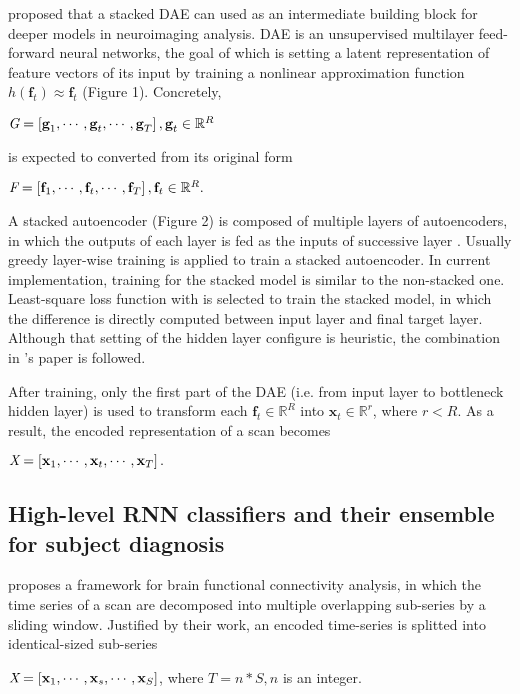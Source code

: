 \textcite{suk16} proposed that a stacked DAE can used as an intermediate building block for deeper models in neuroimaging analysis. DAE is an unsupervised multilayer feed-forward neural networks, the goal of which is setting a latent representation of feature vectors of its input by training a nonlinear approximation function $h(\textbf{f}_t) \approx \textbf{f}_t$ (Figure 1). Concretely, 
\begin{center}
$\emph{G} = \left[ \textbf{g}_1, \cdots, \textbf{g}_t, \cdots, \textbf{g}_T \right], \textbf{g}_t \in \mathbb{R}^{R}$ 
\end{center}
is expected to converted from its original form 
\begin{center}
$\emph{F} = \left[ \textbf{f}_1, \cdots, \textbf{f}_t, \cdots, \textbf{f}_T \right], \textbf{f}_t \in \mathbb{R}^{R}. $
\end{center} 

A stacked autoencoder (Figure 2) is composed of multiple layers of autoencoders, in which the outputs of each layer is fed as the inputs of successive layer \cite{stackedDAE}. Usually greedy layer-wise training is applied to train a stacked autoencoder. In current implementation, training for the stacked model is similar to the non-stacked one. Least-square loss function with  is selected to train the stacked model, in which the difference is directly computed between input layer and final target layer. Although that setting of the hidden layer configure is  heuristic, the combination in \textcite{suk16}'s paper is followed. 

After training, only the first part of the DAE (i.e. from input layer to bottleneck hidden layer) is used to transform each $\textbf{f}_t \in  \mathbb{R}^{R}$ into $ \textbf{x}_t \in  \mathbb{R}^{r}$, where $ r < R$. As a result, the encoded representation of a scan becomes
\begin{center}
$\emph{X} = \left[ \textbf{x}_1, \cdots, \textbf{x}_t, \cdots, \textbf{x}_T \right].$ 
\end{center}

\subsection{High-level RNN classifiers and their ensemble for subject diagnosis}

\textcite{wee15} proposes a framework for brain functional connectivity analysis, in which the time series of a scan are decomposed into multiple overlapping sub-series by a sliding window. Justified by their work, an encoded time-series is splitted into identical-sized sub-series
\begin{center}
$\emph{X} = \left[ \textbf{x}_1, \cdots, \textbf{x}_s, \cdots, \textbf{x}_{S} \right]$, where $T=n*S, n$ is an integer. 
\end{center}

